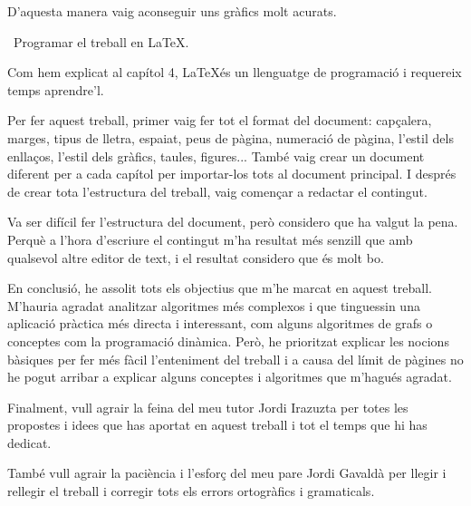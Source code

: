 D'aquesta manera vaig aconseguir uns gràfics molt acurats.

\quad \textbullet\ Programar el treball en \LaTeX. 

Com hem explicat al capítol 4, \LaTeX \space és un llenguatge de programació i requereix temps aprendre'l.

Per fer aquest treball, primer vaig fer tot el format del document: capçalera, marges, tipus de lletra, espaiat, peus de pàgina, numeració de pàgina, l'estil dels enllaços, l'estil dels gràfics, taules, figures... També vaig crear un document diferent per a cada capítol per importar-los tots al document principal. I després de crear tota l'estructura del treball, vaig començar a redactar el contingut.

Va ser difícil fer l'estructura del document, però considero que ha valgut la pena. Perquè a l'hora d'escriure el contingut m'ha resultat més senzill que amb qualsevol altre editor de text, i el resultat considero que és molt bo.

En conclusió, he assolit tots els objectius que m'he marcat en aquest treball. M'hauria agradat analitzar algoritmes més complexos i que tinguessin una aplicació pràctica més directa i interessant, com alguns algoritmes de grafs o conceptes com la programació dinàmica. Però, he prioritzat explicar les nocions bàsiques per fer més fàcil l'enteniment del treball i a causa del límit de pàgines no he pogut arribar a explicar alguns conceptes i algoritmes que m'hagués agradat.

Finalment, vull agrair la feina del meu tutor Jordi Irazuzta per totes les propostes i idees que has aportat en aquest treball i tot el temps que hi has dedicat.

També vull agrair la paciència i l'esforç del meu pare Jordi Gavaldà per llegir i rellegir el treball i corregir tots els errors ortogràfics i gramaticals. 
